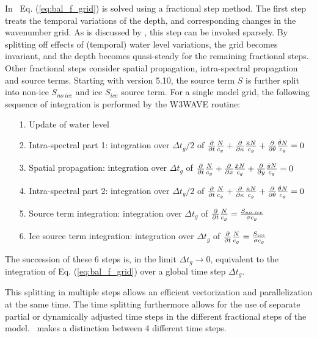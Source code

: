 In \ws\, Eq. (\ref{eq:bal_f_grid}) is solved using a fractional step method. 
The first step treats the temporal variations of
the depth, and corresponding changes in the wavenumber grid. As is discussed
by \cite{tol:GAOS98b}, this step can be invoked sparsely. By splitting off
effects of (temporal) water level variations, the grid becomes invariant, and
the depth becomes quasi-steady for the remaining fractional steps. Other
fractional steps consider spatial propagation, intra-spectral propagation and
source terms. Starting with version 5.10, the source term $S$ is further split into 
non-ice $S_{no~ice}$ and ice $S_{ice}$ source term. For a single model grid, the following sequence of integration  is performed 
by the {\code W3WAVE} routine:
\begin{itemize}
 \item[1.] Update of water level 
 \item[2.] Intra-spectral part 1: integration over $\Delta t_g/2$ of  $\frac{\partial}{\partial t} \frac{N}{c_g} + \frac{\partial}{\partial \kappa} \frac{\dot{\kappa} N}{c_g} + \frac{\partial}{\partial \theta} \frac{\dot{\theta} N}{c_g}  =0 $ 
 \item[3.] Spatial propagation: integration over $\Delta t_g$ of $\frac{\partial}{\partial t} \frac{N}{c_g} +  
\frac{\partial}{\partial x} \frac{\dot{x} N}{c_g} + 
\frac{\partial}{\partial y} \frac{\dot{y} N}{c_g}  = 0$
 \item[4.] Intra-spectral part 2: integration over $\Delta t_g/2$ of  $\frac{\partial}{\partial t} \frac{N}{c_g} + \frac{\partial}{\partial \kappa} \frac{\dot{\kappa} N}{c_g} + \frac{\partial}{\partial \theta} \frac{\dot{\theta} N}{c_g}  =0 $ 
 \item[5.] Source term integration: integration over $\Delta t_g$ of $\frac{\partial}{\partial t} \frac{N}{c_g}   = \frac{S_{no~ice}}{\sigma c_g}$
 \item[6.] Ice source term integration: integration over $\Delta t_g$ of $\frac{\partial}{\partial t} \frac{N}{c_g}   = \frac{S_{ice}}{\sigma c_g}$ 
\end{itemize}
The succession of these 6 steps is, in the limit $\Delta t_g \rightarrow 0$, equivalent to the integration of Eq. (\ref{eq:bal_f_grid}) over a global 
time step $\Delta t_g$. 

This splitting in multiple steps allows an  efficient 
vectorization and parallelization at the same time. The time splitting furthermore
allows for the use of separate partial or dynamically adjusted time steps in
the different fractional steps of the model. \ws\ makes a distinction between
4 different time steps. \label{dt_list}

